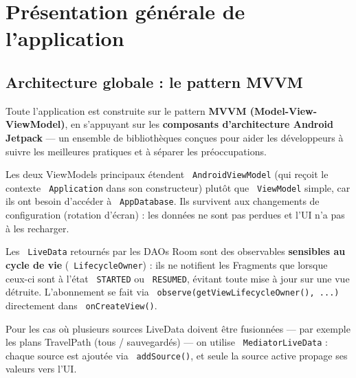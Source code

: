 \documentclass[a4paper,12pt,openany]{report}
\newcommand{\ic}[1]{\texttt{\small\colorbox{lightbg}{\color{navy!90} #1}}}
\begin{document}
\chapter{Présentation générale de l'application}

\section{Architecture globale : le pattern MVVM}

Toute l'application est construite sur le pattern \textbf{MVVM
(Model-View-ViewModel)}, en s'appuyant sur les \textbf{composants d'architecture
Android Jetpack} — un ensemble de bibliothèques conçues pour aider les
développeurs à suivre les meilleures pratiques et à séparer les préoccupations.

Les deux ViewModels principaux étendent \ic{AndroidViewModel} (qui reçoit le
contexte \ic{Application} dans son constructeur) plutôt que \ic{ViewModel} simple,
car ils ont besoin d'accéder à \ic{AppDatabase}. Ils survivent aux changements
de configuration (rotation d'écran) : les données ne sont pas perdues et l'UI
n'a pas à les recharger.

Les \ic{LiveData} retournés par les DAOs Room sont des observables \textbf{sensibles
au cycle de vie} (\ic{LifecycleOwner}) : ils ne notifient les Fragments que
lorsque ceux-ci sont à l'état \ic{STARTED} ou \ic{RESUMED}, évitant toute mise à
jour sur une vue détruite. L'abonnement se fait via \ic{observe(getViewLifecycleOwner(), ...)}
directement dans \ic{onCreateView()}.

Pour les cas où plusieurs sources LiveData doivent être fusionnées — par exemple
les plans TravelPath (tous / sauvegardés) — on utilise \ic{MediatorLiveData} :
chaque source est ajoutée via \ic{addSource()}, et seule la source active
propage ses valeurs vers l'UI.
\end{document}
